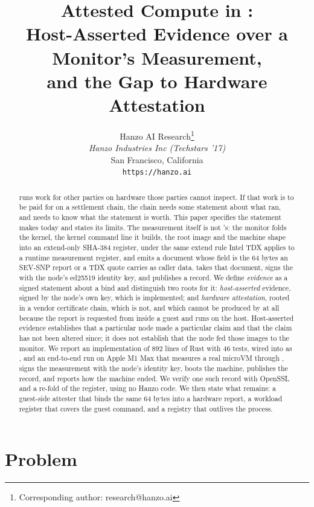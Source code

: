 \documentclass[11pt]{article}
\title{\textbf{Attested Compute in \code{hanzod}:\\
Host-Asserted Evidence over a Monitor's Measurement,\\ and the Gap to Hardware
Attestation}}
\author{
    Hanzo AI Research\thanks{Corresponding author: research@hanzo.ai} \\
    \textit{Hanzo Industries Inc (Techstars '17)} \\
    San Francisco, California \\
    \texttt{https://hanzo.ai}
}
\date{}
\theoremstyle{definition}
\begin{document}
\maketitle

\begin{abstract}
 runs work for other parties on hardware those parties cannot
inspect. If that work is to be paid for on a settlement chain, the chain needs
some statement about what ran, and needs to know what the statement is worth.
This paper specifies the statement  makes today and states its
limits. The measurement itself is not 's: the 
monitor folds the kernel, the kernel command line it builds, the root image and
the machine shape into an extend-only SHA-384 register, under the same extend
rule Intel TDX applies to a runtime measurement register, and emits a document
whose  field is the 64 bytes an SEV-SNP report or a TDX quote carries
as caller data.  takes that document, signs the  with
the node's ed25519 identity key, and publishes a record. We define
\emph{evidence} as a signed statement about a bind and distinguish two roots for
it: \emph{host-asserted} evidence, signed by the node's own key, which is
implemented; and \emph{hardware attestation}, rooted in a vendor certificate
chain, which is not, and which cannot be produced by  at all
because the report is requested from inside a guest and  runs on
the host. Host-asserted evidence establishes that a particular node made a
particular claim and that the claim has not been altered since; it does not
establish that the node fed those images to the monitor. We report an
implementation of 892 lines of Rust with 46 tests, wired into  as
, and an end-to-end run on Apple M1 Max that measures a
real microVM through , signs the measurement with the node's
identity key, boots the machine, publishes the record, and reports how the
machine ended. We verify one such record with OpenSSL and a re-fold of the
register, using no Hanzo code. We then state what
remains: a guest-side attester that binds the same 64 bytes into a hardware
report, a workload register that covers the guest command, and a registry that
outlives the process.
\end{abstract}

\section{Problem}
\end{document}
